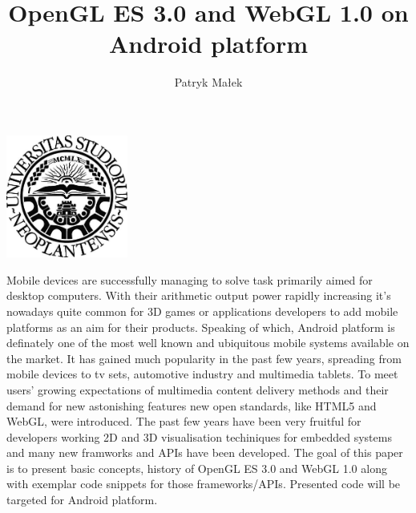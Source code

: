 \documentclass[a4paper,11pt]{article}
\renewenvironment{abstract}
{\itshape \small
  \begin{center}
  \bfseries \abstractname\vspace{-.5em}\vspace{0pt}
  \end{center}
  \list{}{
    \setlength{\leftmargin}{1.6cm}%
    \setlength{\rightmargin}{\leftmargin}%
  }%
  \item\relax}
{\endlist}
\begin{document}
\label{Title} 
\title{\textbf{OpenGL ES 3.0 and WebGL 1.0 on Android platform \vspace{3pc}}}
\author{\Large Patryk Małek}
\date{}         %
\maketitle
\thispagestyle{empty}


\vspace{5pc}

\centerline{
\includegraphics[width=0.3\textwidth,height=0.3\textheight,keepaspectratio]{NoviSadLogoGray.jpg}
}

\vspace{6pc}

\begin{abstract}
\label{Abstract}
Mobile devices are successfully managing to solve task primarily aimed for desktop computers.
With their arithmetic output power rapidly increasing it's nowadays quite common for 3D games or applications developers to add mobile platforms as an aim for their products.  
Speaking of which, Android platform is definately one of the most well known and ubiquitous mobile systems available on the market.
It has gained much popularity in the past few years, spreading from mobile devices to tv sets, automotive industry and multimedia tablets. 
\newline To meet users' growing expectations of multimedia content delivery methods and their demand for new astonishing features new open standards, like HTML5 and WebGL, were introduced. 
The past few years have been very fruitful for developers working 2D and 3D visualisation techiniques for embedded systems and many new framworks and APIs have been developed.
\newline The goal of this paper is to present basic concepts, history of OpenGL ES 3.0 and WebGL 1.0 along with exemplar code snippets for those frameworks/APIs.
Presented code will be targeted for Android platform.
\end{abstract}
\pagebreak
\end{document}

